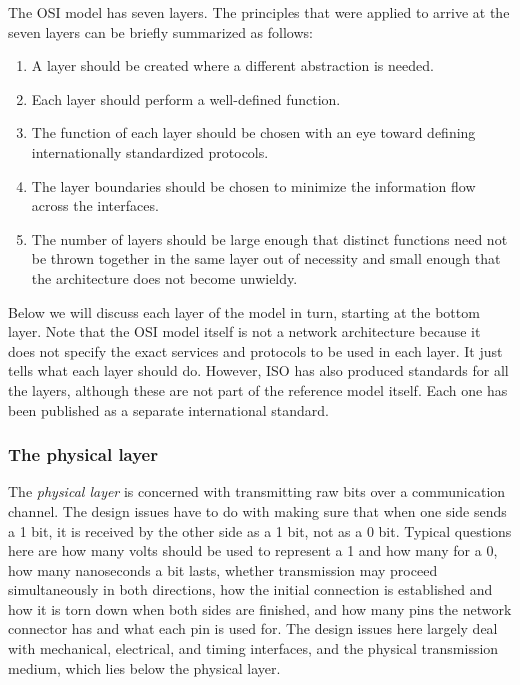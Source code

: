 The OSI model has seven layers.
The principles that were applied to arrive at the seven layers can be briefly summarized as follows:

\begin{enumerate}
\item A layer should be created where a different abstraction is needed.
\item Each layer should perform a well-defined function.
\item The function of each layer should be chosen with an eye toward defining internationally standardized protocols.
\item The layer boundaries should be chosen to minimize the information flow across the interfaces.
\item The number of layers should be large enough that distinct functions need not be thrown together in the same layer out of necessity and small enough that the architecture does not become unwieldy.
\end{enumerate}

Below we will discuss each layer of the model in turn, starting at the
bottom layer. Note that the OSI model itself is not a network
architecture because it does not specify the exact services and
protocols to be used in each layer. It just tells what each layer should
do. However, ISO has also produced standards for all the layers,
although these are not part of the reference model itself. Each one has
been published as a separate international standard.

\subsubsection{The physical layer}

The \emph{physical layer} is concerned with transmitting raw bits over a communication channel.
The design issues have to do with making sure that when one side sends a 1 bit, it is received by the other side as a 1 bit, not as a 0 bit.
Typical questions here are how many volts should be used to represent a 1 and how many for a 0, how many nanoseconds a bit lasts, whether transmission may proceed simultaneously in both directions, how the initial connection is established and how it is torn down when both sides are finished, and how many pins the network connector has and what each pin is used for.
The design issues here largely deal with mechanical, electrical, and timing interfaces, and the physical transmission medium, which lies below the physical layer.


